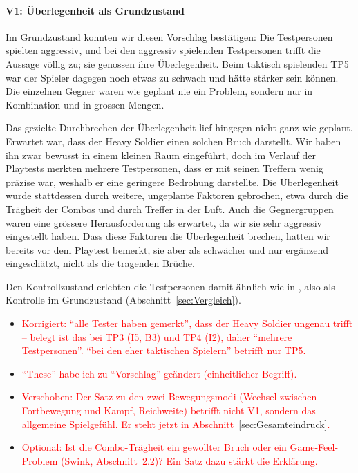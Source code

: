 \documentclass[../Main.tex]{subfiles}
\begin{document}
\paragraph{V1: Überlegenheit als Grundzustand}
Im Grundzustand konnten wir diesen Vorschlag bestätigen: Die Testpersonen spielten aggressiv, und bei den aggressiv spielenden Testpersonen trifft die Aussage völlig zu; sie genossen ihre Überlegenheit. Beim taktisch spielenden TP5 war der Spieler dagegen noch etwas zu schwach und hätte stärker sein können. Die einzelnen Gegner waren wie geplant nie ein Problem, sondern nur in Kombination und in grossen Mengen.

Das gezielte Durchbrechen der Überlegenheit lief hingegen nicht ganz wie geplant. Erwartet war, dass der Heavy Soldier einen solchen Bruch darstellt. Wir haben ihn zwar bewusst in einem kleinen Raum eingeführt, doch im Verlauf der Playtests merkten mehrere Testpersonen, dass er mit seinen Treffern wenig präzise war, weshalb er eine geringere Bedrohung darstellte. Die Überlegenheit wurde stattdessen durch weitere, ungeplante Faktoren gebrochen, etwa durch die Trägheit der Combos und durch Treffer in der Luft. Auch die Gegnergruppen waren eine grössere Herausforderung als erwartet, da wir sie sehr aggressiv eingestellt haben. Dass diese Faktoren die Überlegenheit brechen, hatten wir bereits vor dem Playtest bemerkt, sie aber als schwächer und nur ergänzend eingeschätzt, nicht als die tragenden Brüche.

Den Kontrollzustand erlebten die Testpersonen damit ähnlich wie in , also als Kontrolle im Grundzustand (Abschnitt~\ref{sec:Vergleich}).

\begin{itemize}[leftmargin=1.5cm]
    \item \textcolor{red}{Korrigiert: \enquote{alle Tester haben gemerkt}, dass der Heavy Soldier ungenau trifft -- belegt ist das bei TP3 (I5, B3) und TP4 (I2), daher \enquote{mehrere Testpersonen}. \enquote{bei den eher taktischen Spielern} betrifft nur TP5.}
    \item \textcolor{red}{\enquote{These} habe ich zu \enquote{Vorschlag} geändert (einheitlicher Begriff).}
    \item \textcolor{red}{Verschoben: Der Satz zu den zwei Bewegungsmodi (Wechsel zwischen Fortbewegung und Kampf, Reichweite) betrifft nicht V1, sondern das allgemeine Spielgefühl. Er steht jetzt in Abschnitt~\ref{sec:Gesamteindruck}.}
    \item \textcolor{red}{Optional: Ist die Combo-Trägheit ein gewollter Bruch oder ein Game-Feel-Problem (Swink, Abschnitt~2.2)? Ein Satz dazu stärkt die Erklärung.}
\end{itemize}
\end{document}
